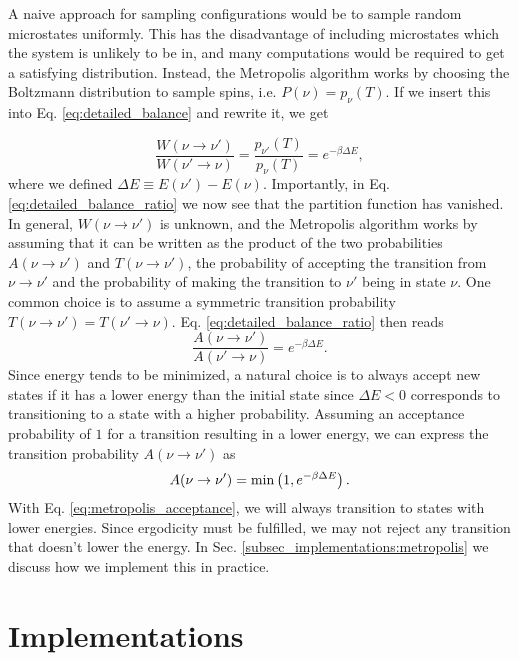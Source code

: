 A naive approach for sampling configurations would be to sample random microstates uniformly. This has the disadvantage of including microstates which the system is unlikely to be in, and many computations would be required to get a satisfying distribution. Instead, the Metropolis algorithm works by choosing the Boltzmann distribution to sample spins, i.e. $P(\nu)=p_\nu(T)$. If we insert this into Eq. \eqref{eq:detailed_balance} and rewrite it, we get 

\begin{equation}\label{eq:detailed_balance_ratio}
    \frac{W(\nu\to \nu')}{W(\nu'\to \nu)} = \frac{p_{\nu'}(T)}{p_\nu(T)} = e^{-\beta \Delta E},
\end{equation}
where we defined $\Delta E \equiv E(\nu')-E(\nu)$. Importantly, in Eq. \eqref{eq:detailed_balance_ratio} we now see that the partition function has vanished. In general, $W(\nu\to\nu')$ is unknown, and the Metropolis algorithm works by assuming that it can be written as the product of the two probabilities $A(\nu\to\nu')$ and $T(\nu\to\nu')$, the probability of accepting the transition from $\nu\to\nu'$ and the probability of making the transition to $\nu'$ being in state $\nu$. One common choice is to assume a symmetric transition probability $T(\nu\to\nu')=T(\nu'\to\nu)$. Eq. \eqref{eq:detailed_balance_ratio} then reads 
\begin{equation}\label{eq:acceptance_rate}
    \frac{A(\nu\to\nu')}{A(\nu'\to\nu)}=e^{-\beta \Delta E}. 
\end{equation}
Since energy tends to be minimized, a natural choice is to always accept new states if it has a lower energy than the initial state since $\Delta E<0$ corresponds to transitioning to a state with a higher probability. Assuming an acceptance probability of $1$ for a transition resulting in a lower energy, we can express the transition probability $A(\nu\to\nu')$ as 
\begin{equation} \label{eq:metropolis_acceptance}
    A(\nu\to\nu') = \min\left( 1,e^{-\beta \Delta E} \right).
\end{equation}  
With Eq. \eqref{eq:metropolis_acceptance}, we will always transition to states with lower energies. Since ergodicity must be fulfilled, we may not reject any transition that doesn't lower the energy. In Sec. \ref{subsec_implementations:metropolis} we discuss how we implement this in practice.    


\section{Implementations}\label{sec:implementations}

